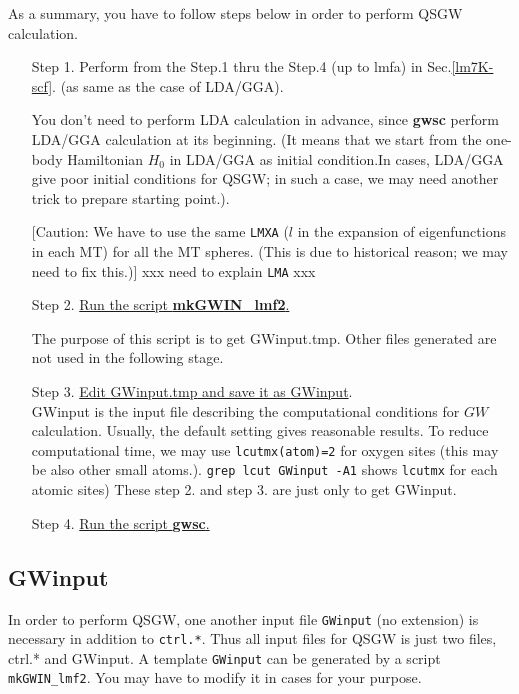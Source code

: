 \documentclass[a4paper,10pt,epsf,fleqn]{article}
\newcommand{\GW}{$GW$}
\newcommand{\exe}[1]{{\bf #1}}
\newcommand{\io}[1]{{\sf  #1}}
\begin{document}
As a summary, you have to follow steps below in order to perform QSGW calculation.
\begin{enumerate}
\item[Step 1.] 
Perform from the Step.1 thru the Step.4 (up to lmfa) in Sec.\ref{lm7K-scf}.
(as same as the case of LDA/GGA).

You don't need to perform LDA calculation in advance,
since \exe{gwsc} perform LDA/GGA calculation at its beginning.
(It means that we start from the one-body Hamiltonian $H_0$ in LDA/GGA as initial condition.In cases, LDA/GGA give poor initial conditions for QSGW; in such a case,
we may need another trick to prepare starting point.).

[Caution: We have to use the same \verb#LMXA# ($l$ in the expansion of eigenfunctions 
in each MT) for all the MT spheres. (This is due to historical reason;
we may need to fix this.)]
xxx need to explain \verb#LMA# xxx

\item[Step 2.]\underline{Run the script \exe{mkGWIN\_lmf2}.}

The purpose of this script is to get \io{GWinput.tmp}.
Other files generated are not used in the following stage.

\item[Step 3.]\underline{Edit \io{GWinput.tmp} and save it as \io{GWinput}}.\\
\io{GWinput} is the input file describing the computational 
conditions for \GW calculation. 
Usually, the default setting gives reasonable results.
To reduce computational time, we may
use \verb#lcutmx(atom)=2# for oxygen sites 
(this may be also other small atoms.).
\verb#grep lcut GWinput -A1# shows \verb#lcutmx# for each atomic sites)
These step 2. and step 3. are just only to get \io{GWinput}.

\item[Step 4.]\underline{ Run the script \exe{gwsc}.}
\end{enumerate}


\subsection{GWinput}
\label{GWinput}
In order to perform QSGW, one another input file 
\verb+GWinput+ (no extension) is necessary in addition to \verb+ctrl.*+.
Thus all input files for QSGW is just two files, ctrl.* and GWinput.
A template \verb+GWinput+ can be generated by a script \verb+mkGWIN_lmf2+. 
You may have to modify it in cases for your purpose.\\
\end{document}
